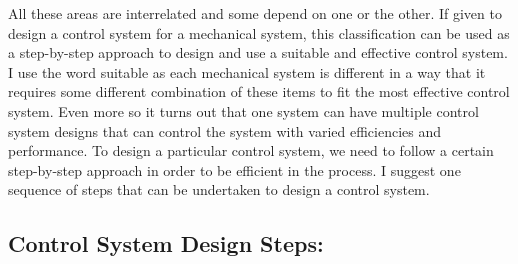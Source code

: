\documentclass{article}
\begin{document}
All these areas are interrelated and some depend on one or the other. If given to design a control system for a mechanical system, this classification can be used as a step-by-step approach to design and use a suitable and effective control system. I use the word suitable as each mechanical system is different in a way that it requires some different combination of these items to fit the most effective control system. Even more so it turns out that one system can have multiple control system designs that can control the system with varied efficiencies and performance. To design a particular control system, we need to follow a certain step-by-step approach in order to be efficient in the process. I suggest one sequence of steps that can be undertaken to design a control system.
\subsection{Control System Design Steps:}
\end{document}
